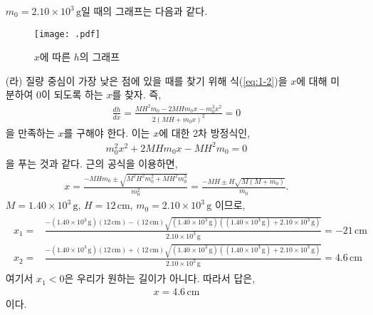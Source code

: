 \documentclass[floatfix,nofootinbib,superscriptaddress,fleqn]{revtex4-2}
\begin{document}
\begin{itemize}
  $m_0=2.10\times 10^3\,\mathrm{g}$일 때의 그래프는 다음과 같다.
  \begin{figure}[htbp]
    \centering
    \texttt{[image: .pdf]}
    \caption{$x$에 따른 $h$의 그래프}
    \label{<label>}
  \end{figure}
  \item[(라)] 질량 중심이 가장 낮은 점에 있을 때를 찾기 위해 식(\ref{eq:1-2})을 
  $x$에 대해 미분하여 0이 되도록 하는 $x$를 찾자. 즉,
  \begin{align}
    \frac{dh}{dx} = \frac{MH^2m_0-2MHm_0x-m_0^2x^2}{2(MH+m_0x)^2} = 0
  \end{align}
  을 만족하는 $x$를 구해야 한다. 이는 $x$에 대한 2차 방정식인,
  \begin{align}
    m_0^2x^2 +2MHm_0x -MH^2m_0 = 0 
  \end{align}
  을 푸는 것과 같다. 근의 공식을 이용하면,
  \begin{align}
    x = \frac{-MHm_0\pm\sqrt{M^2H^2m_0^2+MH^2m_0^3}}{m_0^2}
    = \frac{-MH\pm H\sqrt{M(M+m_0)}}{m_0}.
  \end{align}
  $M=1.40\times 10^{3}\,\mathrm{g}$, $H=12\,\mathrm{cm}$,
  $m_0=2.10\times 10^3\,\mathrm{g}$ 이므로,
  \begin{align}
    \begin{split}
      x_1 =& \frac{-(1.40\times 10^{3}\,\mathrm{g})(12\,\mathrm{cm}) 
      - (12\,\mathrm{cm})\sqrt{(1.40\times 10^{3}\,\mathrm{g})
      ((1.40\times 10^{3}\,\mathrm{g})
      +2.10\times 10^3\,\mathrm{g})}}{2.10\times 10^3\,\mathrm{g}}
      =-21\,\mathrm{cm}  \\
      x_2 =& \frac{-(1.40\times 10^{3}\,\mathrm{g})(12\,\mathrm{cm}) 
      + (12\,\mathrm{cm})\sqrt{(1.40\times 10^{3}\,\mathrm{g})
      ((1.40\times 10^{3}\,\mathrm{g})
      +2.10\times 10^3\,\mathrm{g})}}{2.10\times 10^3\,\mathrm{g}}
      =4.6\,\mathrm{cm}
    \end{split}
  \end{align}
  여기서 $x_1<0$은 우리가 원하는 길이가 아니다. 따라서 답은,
  \begin{align}
    x = 4.6\,\mathrm{cm}
  \end{align}
  이다.
\end{itemize}

\vspace{1cm}



\vspace{1cm}
\end{document}
